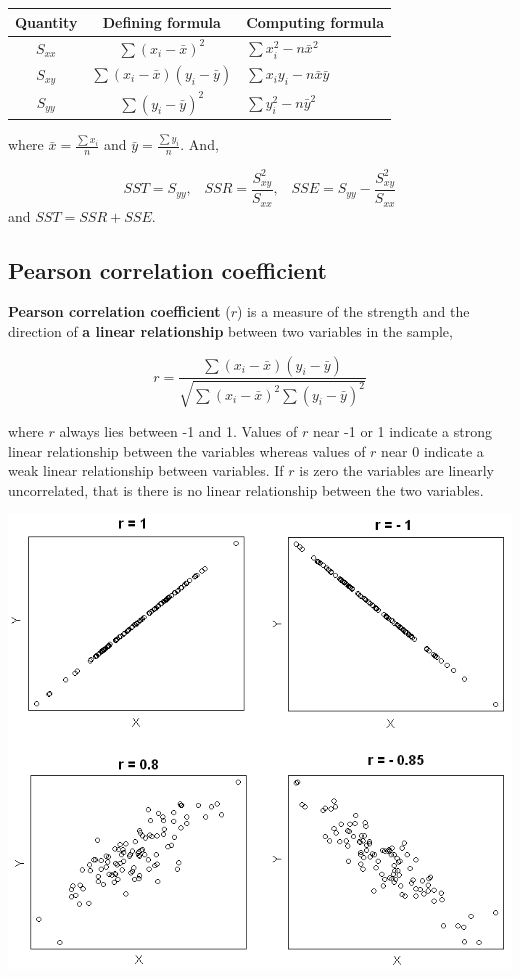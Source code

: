 \documentclass[
]{article}
\begin{document}
\begin{longtable}[]{@{}ccl@{}}
\toprule\noalign{}
Quantity & Defining formula & Computing formula \\
\midrule\noalign{}
\endhead
\bottomrule\noalign{}
\endlastfoot
\(S_{xx}\) & \(\sum (x_i-\bar{x})^2\) & \(\sum x^2_i - n \bar{x}^2\) \\
\(S_{xy}\) & \(\sum (x_i-\bar{x})(y_i-\bar{y})\) &
\(\sum x_i y_i - n \bar{x}\bar{y}\) \\
\(S_{yy}\) & \(\sum (y_i-\bar{y})^2\) & \(\sum y^2_i - n \bar{y}^2\) \\
\end{longtable}

where \(\bar{x}=\frac{\sum x_i}{n}\) and \(\bar{y}=\frac{\sum y_i}{n}\).
And,

\[SST=S_{yy},\;\;\; SSR=\frac{S^2_{xy}}{S_{xx}},\;\;\; SSE=S_{yy}-\frac{S^2_{xy}}{S_{xx}} \]
and \(SST=SSR+SSE\).

\hypertarget{pearson-correlation-coefficient}{%
\subsection{Pearson correlation
coefficient}\label{pearson-correlation-coefficient}}

\textbf{Pearson correlation coefficient} (\(r\)) is a measure of the
strength and the direction of \textbf{a linear relationship} between two
variables in the sample,

\[r=\frac{\sum(x_{i} -\bar{x})(y_{i} -\bar{y}) }{\sqrt{\sum (x_{i} -\bar{x})^{2}  \sum (y_{i} -\bar{y})^{2}  } } \]

where \(r\) always lies between -1 and 1. Values of \(r\) near -1 or 1
indicate a strong linear relationship between the variables whereas
values of \(r\) near 0 indicate a weak linear relationship between
variables. If \(r\) is zero the variables are linearly uncorrelated,
that is there is no linear relationship between the two variables.

\begin{center}\includegraphics[width=0.6\linewidth,height=0.6\textheight]{figures/rr1} \end{center}
\end{document}
